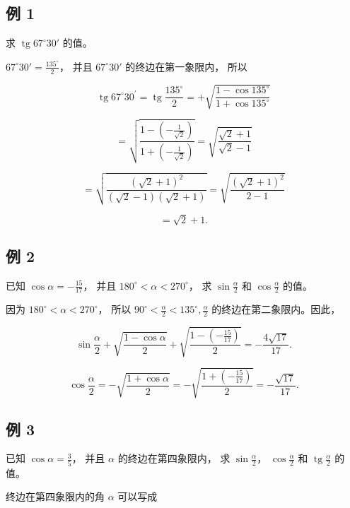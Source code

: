 \subsection{例 1}

求 \(\operatorname{tg}67^{\circ}30'\) 的值。

 \(67^{\circ}30' = \frac{135^{\circ}}{2}\)， 并且
\(67^{\circ}30'\) 的终边在第一象限内， 所以

\[
\operatorname{tg} 67 ^{\circ} 30 ^{\prime} = \operatorname{tg} \frac {135 ^{\circ}}{2} = + \sqrt {\frac {1 - \cos 135 ^{\circ}}{1 + \cos 135 ^{\circ}}}
\]

\[
= \sqrt {\frac {1 - \left(- \frac {1}{\sqrt {2}}\right)}{1 + \left(- \frac {1}{\sqrt {2}}\right)}} = \sqrt {\frac {\sqrt {2} + 1}{\sqrt {2} - 1}}
\]

\[
= \sqrt {\frac {(\sqrt {2} + 1) ^ {2}}{(\sqrt {2} - 1) (\sqrt {2} + 1)}} = \sqrt {\frac {(\sqrt {2} + 1) ^ {2}}{2 - 1}}
\]

\[
= \sqrt {2} + 1.
\]

\subsection{例 2}

已知 \(\cos \alpha = -\frac{15}{17}\)， 并且
\(180^{\circ} < \alpha < 270^{\circ}\)， 求 \(\sin \frac{\alpha}{2}\) 和
\(\cos \frac{\alpha}{2}\) 的值。

 因为 \(180^{\circ} < \alpha < 270^{\circ}\)， 所以
\(90^{\circ} < \frac{\alpha}{2} < 135^{\circ}, \frac{\alpha}{2}\)
的终边在第二象限内。因此，

\[
\sin \frac {\alpha}{2} + \sqrt {\frac {1 - \cos \alpha}{2}} + \sqrt {\frac {1 - \left(- \frac {15}{17}\right)}{2}} = - \frac {4 \sqrt {17}}{17}.
\]

\[
\cos \frac {\alpha}{2} = - \sqrt {\frac {1 + \cos \alpha}{2}} = - \sqrt {\frac {1 + \left(- \frac {15}{17}\right)}{2}} = - \frac {\sqrt {17}}{17}.
\]

\subsection{例 3}

已知 \(\cos \alpha = \frac{3}{5}\)， 并且 \(\alpha\)
的终边在第四象限内， 求 \(\sin \frac{\alpha}{2}\)，
\(\cos \frac{\alpha}{2}\) 和 \(\operatorname{tg} \frac{\alpha}{2}\)
的值。

 终边在第四象限内的角 \(\alpha\) 可以写成

